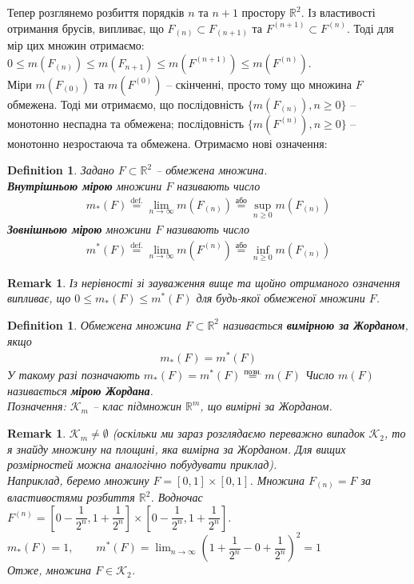 \documentclass[a4paper, 10pt]{article}
\theoremstyle{theoremdd}
\theoremstyle{theoremdd}
\newtheorem{definition}[theorem]{Definition}
\theoremstyle{theoremdd}
\theoremstyle{theoremdd}
\theoremstyle{theoremdd}
\theoremstyle{theoremdd}
\newtheorem{remark}[theorem]{Remark}
\theoremstyle{theoremdd}
\theoremstyle{theoremdd}
\begin{document}
Тепер розглянемо розбиття порядків $n$ та $n+1$ простору $\mathbb{R}^2$. Із властивості отримання брусів, випливає, що $F_{(n)} \subset F_{(n+1)}$ та $F^{(n+1)} \subset F^{(n)}$. Тоді для мір цих множин отримаємо:\\
$0 \leq m(F_{(n)}) \leq m(F_{n+1}) \leq m(F^{(n+1)}) \leq m(F^{(n)})$.\\
Міри $m(F_{(0)})$ та $m(F^{(0)})$ -- скінченні, просто тому що множина $F$ обмежена. Тоді ми отримаємо, що послідовність $\{m(F_{(n)}), n \geq 0\}$ -- монотонно неспадна та обмежена; послідовність $\{m(F^{(n)}), n \geq 0\}$ -- монотонно незростаюча та обмежена. Отримаємо нові означення:

\begin{definition}
Задано $F \subset \mathbb{R}^2$ -- обмежена множина.\\
\textbf{Внутрішньою мірою} множини $F$ називають число
\begin{align*}
m_*(F) \overset{\text{def.}}{=} \lim_{n \to \infty} m(F_{(n)}) \overset{\text{або}}{=} \sup_{n \geq 0} m(F_{(n)})
\end{align*}
\textbf{Зовнішньою мірою} множини $F$ називають число
\begin{align*}
m^*(F) \overset{\text{def.}}{=} \lim_{n \to \infty} m(F^{(n)}) \overset{\text{або}}{=} \inf_{n \geq 0} m(F_{(n)})
\end{align*}
\end{definition}

\begin{remark}
Із нерівності зі зауваження вище та щойно отриманого означення випливає, що $0 \leq m_*(F) \leq m^*(F)$ для будь-якої обмеженої множини $F$.
\end{remark}

\begin{definition}
Обмежена множина $F \subset \mathbb{R}^2$ називається \textbf{вимірною за Жорданом}, якщо
\begin{align*}
m_*(F) = m^*(F)
\end{align*}
У такому разі позначають $m_*(F) = m^*(F) \overset{\text{позн.}}{=} m(F)$ Число $m(F)$ називається \textbf{мірою Жордана}.\\
Позначення: $\mathcal{K}_m$ -- клас підмножин $\mathbb{R}^m$, що вимірні за Жорданом.
\end{definition}

\begin{remark}
$\mathcal{K}_m \neq \emptyset$ (оскільки ми зараз розглядаємо переважно випадок $\mathcal{K}_2$, то я знайду множину на площині, яка вимірна за Жорданом. Для вищих розмірностей можна аналогічно побудувати приклад).\\
Наприклад, беремо множину $F = [0,1] \times [0,1]$. Множина $F_{(n)} = F$ за властивостями розбиття $\mathbb{R}^2$. Водночас $F^{(n)} = \left[ 0 - \dfrac{1}{2^n}, 1+\dfrac{1}{2^n} \right] \times \left[0 - \dfrac{1}{2^n}, 1+\dfrac{1}{2^n} \right]$.\\
$m_*(F) = 1, \qquad m^*(F) = \displaystyle\lim_{n \to \infty} \left( 1+\dfrac{1}{2^n} - 0 + \dfrac{1}{2^n} \right)^2 = 1$\\
Отже, множина $F \in \mathcal{K}_2$.
\end{remark}
\end{document}
